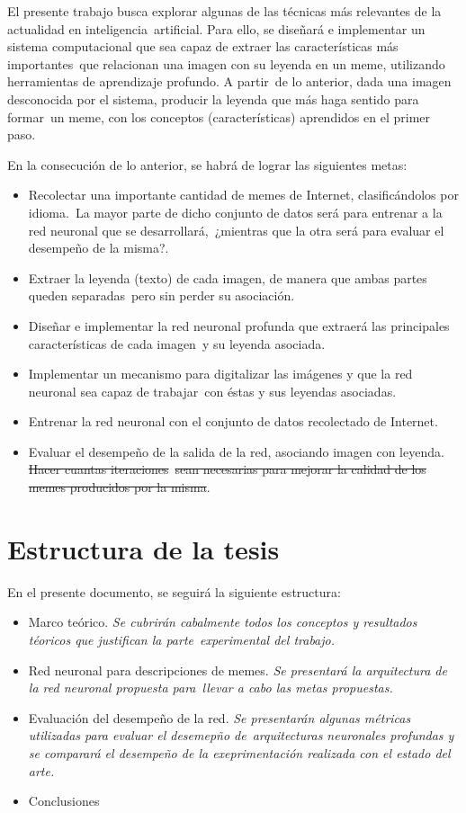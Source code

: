 \noindent
El presente trabajo busca explorar algunas de las técnicas más relevantes de la actualidad en inteligencia\
artificial. Para ello, se diseñará e implementar un sistema computacional que sea capaz de extraer las características más importantes\
que relacionan una imagen con su leyenda en un meme, utilizando herramientas de aprendizaje profundo. A partir\
de lo anterior, dada una imagen desconocida por el sistema, producir la leyenda que más haga sentido para formar\
un meme, con los conceptos (características) aprendidos en el primer paso.\par
En la consecución de lo anterior, se habrá de lograr las siguientes metas:
\begin{itemize}
\item Recolectar una importante cantidad de memes de Internet, clasificándolos por idioma.\
  La mayor parte de dicho conjunto de datos será para entrenar a la red neuronal que se desarrollará,\
  ¿mientras que la otra será para evaluar el desempeño de la misma?.
\item Extraer la leyenda (texto) de cada imagen, de manera que ambas partes queden separadas\
  pero sin perder su asociación.
\item Diseñar e implementar la red neuronal profunda que extraerá las principales características de cada imagen\
  y su leyenda asociada.
\item Implementar un mecanismo para digitalizar las imágenes y que la red neuronal sea capaz de trabajar\
  con éstas y sus leyendas asociadas.
\item Entrenar la red neuronal con el conjunto de datos recolectado de Internet.
\item Evaluar el desempeño de la salida de la red, asociando imagen con leyenda. \st{Hacer cuantas iteraciones}\
  \st{sean necesarias para mejorar la calidad de los memes producidos por la misma}.
\end{itemize}

\section{Estructura de la tesis}

\noindent
En el presente documento, se seguirá la siguiente estructura:
\begin{itemize}
\item Marco teórico. \emph{Se cubrirán cabalmente todos los conceptos y resultados téoricos que justifican la parte}\
  \emph{experimental del trabajo.}
\item Red neuronal para descripciones de memes. \emph{Se presentará la arquitectura de la red neuronal propuesta para}\
  \emph{llevar a cabo las metas propuestas.}
\item Evaluación del desempeño de la red. \emph{Se presentarán algunas métricas utilizadas para evaluar el desemepño de}\
  \emph{arquitecturas neuronales profundas y se comparará el desempeño de la exeprimentación realizada con el estado del arte.}
\item Conclusiones
\end{itemize}
